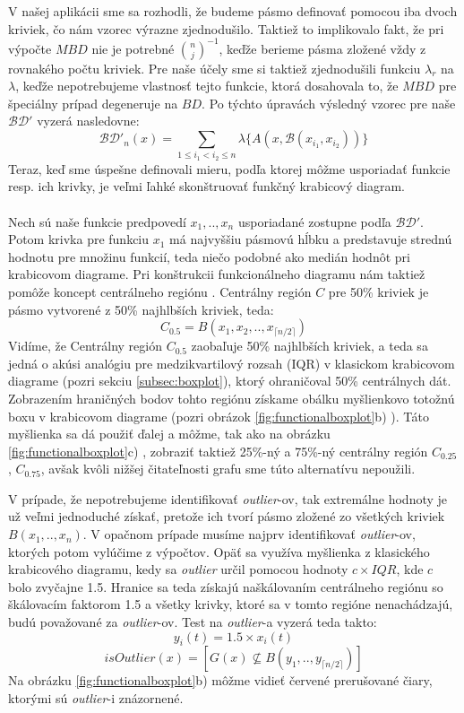 V našej aplikácii sme sa rozhodli, že budeme pásmo definovať pomocou iba dvoch kriviek, čo nám vzorec výrazne zjednodušilo. Taktiež to implikovalo fakt, že pri výpočte $ MBD $ nie je potrebné $ {n \choose j}^{-1} $, keďže berieme pásma zložené vždy z rovnakého počtu kriviek. Pre naše účely sme si taktiež zjednodušili funkciu $ \lambda_{r} $ na $ \lambda $, keďže nepotrebujeme vlastnosť tejto funkcie, ktorá dosahovala to, že $ MBD $ pre špeciálny prípad degeneruje na $ BD $. Po týchto úpravách výsledný vzorec pre naše $ \mathcal{BD}' $ vyzerá nasledovne:
\[
	\mathcal{BD}'_{n}(x) = \sum_{1 \leq i_{1} < i_{2} \leq n} \lambda\{ A(x, \mathcal{B}(x_{i_{1}},x_{i_{2}})) \}
\]
Teraz, keď sme úspešne definovali mieru, podľa ktorej môžme usporiadať funkcie resp. ich krivky, je veľmi ľahké skonštruovať funkčný krabicový diagram.

\paragraph{}
Nech sú naše funkcie predpovedí $ x_{1},.., x_{n} $ usporiadané zostupne podľa $ \mathcal{BD}' $. Potom krivka pre funkciu $ x_{1} $ má najvyššiu pásmovú hĺbku a predstavuje strednú hodnotu pre množinu funkcií, teda niečo podobné ako medián hodnôt pri krabicovom diagrame. Pri konštrukcii funkcionálneho diagramu nám taktiež pomôže koncept centrálneho regiónu \cite{Liu}. Centrálny región $ C $ pre 50\% kriviek je pásmo vytvorené z 50\% najhlbších kriviek, teda:
\[
	C_{0.5} = B(x_{1}, x_{2}, .., x_{\lceil n / 2 \rceil} )
\] 
Vidíme, že Centrálny región $ C_{0.5} $ zaobaľuje 50\% najhlbších kriviek, a teda sa jedná o akúsi analógiu pre medzikvartilový rozsah (IQR) v klasickom krabicovom diagrame (pozri sekciu \ref{subsec:boxplot}), ktorý ohraničoval 50\% centrálnych dát. Zobrazením hraničných bodov tohto regiónu získame obálku myšlienkovo totožnú boxu v krabicovom diagrame (pozri obrázok \ref{fig:functionalboxplot}b) ). Táto myšlienka sa dá použiť ďalej a môžme, tak ako na obrázku \ref{fig:functionalboxplot}c) , zobraziť taktiež 25\%-ný a 75\%-ný centrálny región $ C_{0.25} $, $ C_{0.75} $, avšak kvôli nižšej čitateľnosti grafu sme túto alternatívu nepoužili.

V prípade, že nepotrebujeme identifikovať \textit{outlier}-ov, tak extremálne hodnoty je už veľmi jednoduché získať, pretože ich tvorí pásmo zložené zo všetkých kriviek $ B(x_{1}, .., x_{n}) $. V opačnom prípade musíme najprv identifikovať \textit{outlier}-ov, ktorých potom vylúčime z výpočtov. Opäť sa využíva myšlienka z klasického krabicového diagramu, kedy sa \textit{outlier} určil pomocou hodnoty $ c \times IQR $, kde $ c $ bolo zvyčajne 1.5. Hranice sa teda získajú naškálovaním centrálneho regiónu so škálovacím faktorom 1.5 a všetky krivky, ktoré sa v tomto regióne nenachádzajú, budú považované za \textit{outlier}-ov. Test na \textit{outlier}-a vyzerá teda takto:
\[	y_{i}(t) = 1.5 \times x_{i}(t) \]
\[	isOutlier(x) = [ G(x) \nsubseteq B(y_{1},..,y_{\lceil n / 2 \rceil}) ] \]
Na obrázku \ref{fig:functionalboxplot}b) môžme vidieť červené prerušované čiary, ktorými sú \textit{outlier}-i znázornené.

